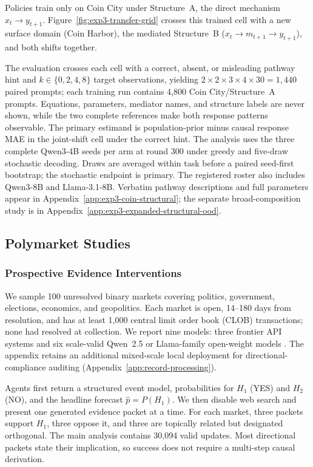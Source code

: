 Policies train only on Coin City under Structure~A, the direct mechanism
$x_t\to y_{t+1}$. Figure~\ref{fig:exp3-transfer-grid} crosses this trained cell
with a new surface domain (Coin Harbor), the mediated Structure~B
($x_t\to m_{t+1}\to y_{t+1}$), and both shifts together.

The evaluation crosses each cell with a correct, absent, or misleading pathway
hint and $k\in\{0,2,4,8\}$ target observations,
yielding $2\times2\times3\times4\times30=1{,}440$ paired prompts; each training run
contains 4,800 Coin City/Structure~A prompts. Equations, parameters, mediator
names, and structure labels are never shown, while the two complete references make
both response patterns observable. The primary estimand is population-prior minus
causal response MAE in the joint-shift cell under the correct hint. The analysis
uses the three complete Qwen3-4B seeds per arm at round 300 under greedy and
five-draw stochastic decoding. Draws are averaged within task before a paired
seed-first bootstrap; the stochastic endpoint is primary. The registered roster
also includes Qwen3-8B and Llama-3.1-8B.
Verbatim pathway descriptions and full parameters appear in
Appendix~\ref{app:exp3-coin-structural}; the separate broad-composition study is in
Appendix~\ref{app:exp3-expanded-structural-ood}.

\subsection{Polymarket Studies}
\label{sec:methods-polymarket}

\subsubsection{Prospective Evidence Interventions}
\label{sec:methods-exp1}

We sample 100 unresolved binary markets covering politics, government, elections,
economics, and geopolitics. Each market is open, 14--180 days from resolution, and
has at least 1,000 central limit order book (CLOB) transactions; none had resolved
at collection. We report nine models: three frontier API systems
\citep{openai2026gpt54,anthropic2026claude48,deepseek2026v4} and six scale-valid
Qwen~2.5 or Llama-family open-weight models
\citep{qwen2025qwen25,grattafiori2024llama}. The appendix retains an additional
mixed-scale local deployment for directional-compliance auditing
(Appendix~\ref{app:record-processing}).

Agents first return a structured event model, probabilities for $H_1$ (YES) and
$H_2$ (NO), and the headline forecast $\hat p=P(H_1)$. We then disable web search
and present one generated evidence packet at a time. For each market, three packets
support $H_1$, three oppose it, and three are topically related but designated
orthogonal. The main analysis contains 30,094 valid updates. Most directional packets
state their implication, so success does not require a multi-step causal
derivation.

